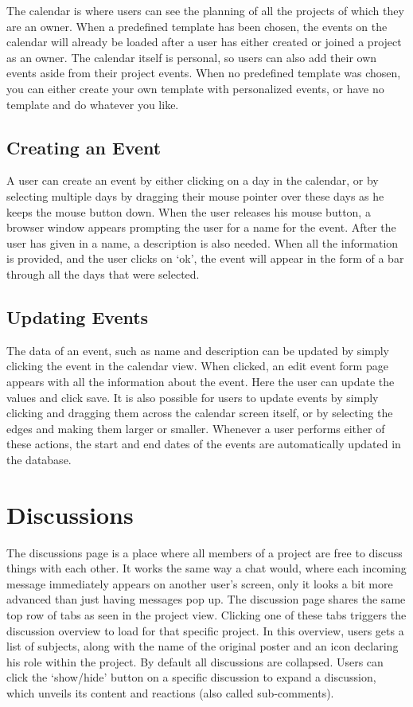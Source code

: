The calendar is where users can see the planning of all the projects of which they are an owner.
When a predefined template has been chosen, the events on the calendar will already be loaded after
a user has either created or joined a project as an owner. The calendar itself is personal, so users can also add their own events aside from their 
project events. When no predefined template was chosen, you can either
create your own template with personalized events, or have no template and do whatever you like.

\subsection{Creating an Event}

A user can create an event by either clicking on a day in the calendar, or by selecting multiple days by dragging their mouse pointer over these days
as he keeps the mouse button down. When the user releases his mouse button, a browser window appears prompting the user for a name for the event. After
the user has given in a name, a description is also needed. When all the information is provided, and the user clicks on `ok', the event will appear
in the form of a bar through all the days that were selected.

\subsection{Updating Events}

The data of an event, such as name and description can be updated by simply clicking the event in the calendar view. When clicked, an edit event 
form page appears with all the information about the event. Here the user can update the values and click save. It is also possible for users
to update events by simply clicking and dragging them across the calendar screen itself, or by selecting the edges and making them larger or
smaller. Whenever a user performs either of these actions, the start and end dates of the events are automatically updated in the database.
\newpage
\section{Discussions}

The discussions page is a place where all members of a project are free to discuss things with each other. It works the same way a chat would, where
each incoming message immediately appears on another user's screen, only it looks a bit more advanced than just having messages pop up.
The discussion page shares the same top row of tabs as seen in the project view. Clicking one of these tabs
triggers the discussion overview to load for that specific project. In this overview, users gets a
list of subjects, along with the name of the original poster and an icon declaring his role within the project. 
By default all discussions are collapsed. Users can click the `show/hide' button on a specific discussion to 
expand a discussion, which unveils its content and reactions (also called sub-comments).


